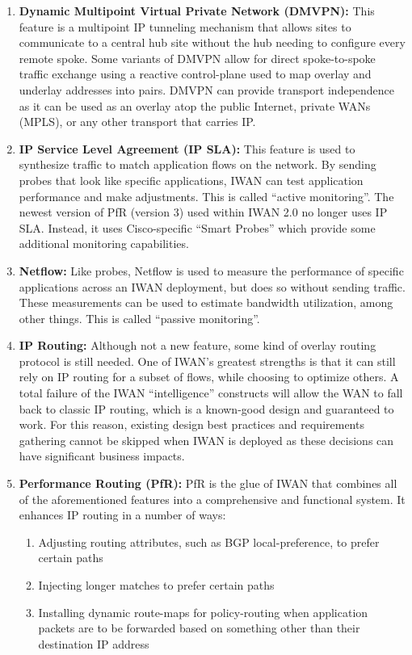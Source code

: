 \begin{enumerate}
  \item \textbf{Dynamic Multipoint Virtual Private Network (DMVPN):} This
  feature is a multipoint IP tunneling mechanism that allows sites to
  communicate to a central hub site without the hub needing to configure every
  remote spoke. Some variants of DMVPN allow for direct spoke-to-spoke traffic
  exchange using a reactive control-plane used to map overlay and underlay
  addresses into pairs. DMVPN can provide transport independence as it can be
  used as an overlay atop the public Internet, private WANs (MPLS), or any
  other transport that carries IP.
  \item \textbf{IP Service Level Agreement (IP SLA):} This feature is used to
  synthesize traffic to match application flows on the network. By sending
  probes that look like specific applications, IWAN can test application
  performance and make adjustments. This is called ``active monitoring''. The
  newest version of PfR (version 3) used within IWAN 2.0 no longer uses IP
  SLA. Instead, it uses Cisco-specific ``Smart Probes'' which provide some
  additional monitoring capabilities.
  \item \textbf{Netflow:} Like probes, Netflow is used to measure the
  performance of specific applications across an IWAN deployment, but does so
  without sending traffic. These measurements can be used to estimate
  bandwidth utilization, among other things. This is called ``passive monitoring''.
  \item \textbf{IP Routing:} Although not a new feature, some kind of overlay
  routing protocol is still needed. One of IWAN’s greatest strengths is that
  it can still rely on IP routing for a subset of flows, while choosing to
  optimize others. A total failure of the IWAN ``intelligence'' constructs
  will allow the WAN to fall back to classic IP routing, which is a known-good
  design and guaranteed to work. For this reason, existing design best
  practices and requirements gathering cannot be skipped when IWAN is deployed
  as these decisions can have significant business impacts.
  \item \textbf{Performance Routing (PfR):} PfR is the glue of IWAN that
  combines all of the aforementioned features into a comprehensive and
  functional system. It enhances IP routing in a number of ways:

  \begin{enumerate}
    \item Adjusting routing attributes, such as BGP local-preference, to
	prefer certain paths
    \item Injecting longer matches to prefer certain paths
    \item Installing dynamic route-maps for policy-routing when application
	packets are to be forwarded based on something other than their destination IP address
  \end{enumerate}

\end{enumerate}

